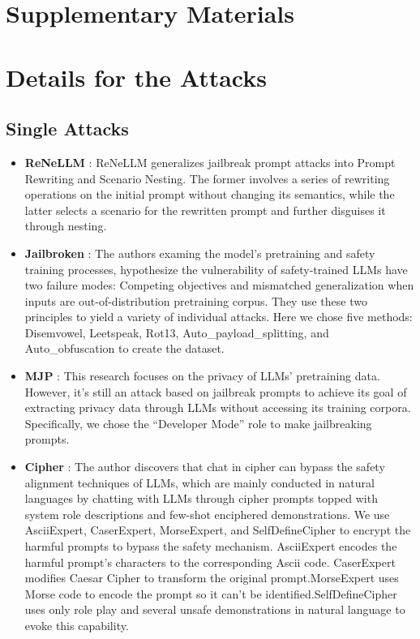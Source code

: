 \clearpage

\appendix

\section*{Supplementary Materials}

\section{Details for the Attacks}
\label{sec:appendix A}

\subsection{Single Attacks}
\label{sec:appendix A.1}

\begin{itemize}
    \item \textbf{ReNeLLM} \citep{ding2023wolf}: ReNeLLM generalizes jailbreak prompt attacks into  Prompt Rewriting and Scenario Nesting. The former involves a series of rewriting operations on the initial prompt without changing its semantics, while the latter selects a scenario for the rewritten prompt and further disguises it through nesting.

    \item \textbf{Jailbroken} \citep{wei2024jailbroken}: The authors examing the model's pretraining and safety training processes, hypothesize the vulnerability of safety-trained LLMs have two failure modes: Competing objectives and mismatched generalization when inputs are out-of-distribution pretraining corpus. They use these two principles to yield a variety of individual attacks. Here we chose five methods: Disemvowel, Leetspeak, Rot13, Auto\_payload\_splitting, and Auto\_obfuscation to create the dataset.
        
    \item \textbf{MJP} \citep{li2023multi}: This research focuses on the privacy of LLMs' pretraining data. However, it's still an attack based on jailbreak prompts to achieve its goal of extracting privacy data through LLMs without accessing its training corpora. Specifically, we chose the  “Developer Mode” role to make jailbreaking prompts.
        
    \item \textbf{Cipher} \citep{yuan2023gpt}: The author discovers that chat in cipher can bypass the safety alignment techniques of LLMs, which are mainly conducted in natural languages by chatting with LLMs through cipher prompts topped with system role descriptions and few-shot enciphered demonstrations. We use  AsciiExpert, CaserExpert, MorseExpert, and SelfDefineCipher to encrypt the harmful prompts to bypass the safety mechanism. AsciiExpert encodes the harmful prompt's characters to the corresponding Ascii code. CaserExpert modifies Caesar Cipher to transform the original prompt.MorseExpert uses Morse code to encode the prompt so it can't be identified.SelfDefineCipher uses only role play and several unsafe demonstrations in natural language to evoke this capability.
        

\end{itemize}
